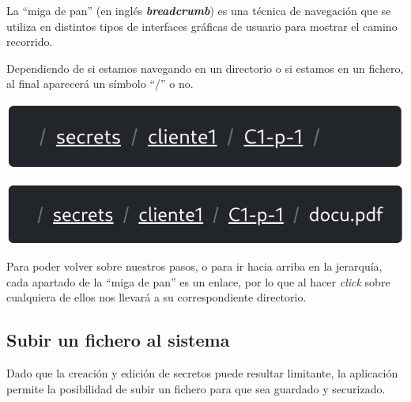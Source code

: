 \documentclass{\ClassPath/viu-tfm-template}
\begin{document}
La “miga de pan” (en inglés \textit{\textbf{breadcrumb}}) es una técnica de navegación que se utiliza en distintos tipos de interfaces gráficas de usuario para mostrar el camino recorrido.

Dependiendo de si estamos navegando en un directorio o si estamos en un fichero, al final aparecerá un símbolo “/” o no.

\begin{center}
    \includegraphics[width=0.6\linewidth]{img/breadcrumb1.png}
\end{center}
\begin{center}
    \includegraphics[width=0.6\linewidth]{img/breadcrumb2.png}
\end{center}

Para poder volver sobre nuestros pasos, o para ir hacia arriba en la jerarquía, cada apartado de la “miga de pan” es un enlace, por lo que al hacer \textit{click} sobre cualquiera de ellos nos llevará a su correspondiente directorio.


\subsection{Subir un fichero al sistema}

Dado que la creación y edición de secretos puede resultar limitante, la aplicación permite la posibilidad de subir un fichero para que sea guardado y securizado.
\end{document}
